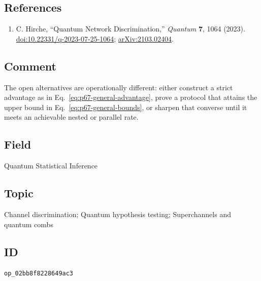 \subsection*{References}

\begin{enumerate}[label={},leftmargin=4.8em,labelsep=0.5em]
  \footnotesize
  \item[\textup{[Hir23]}]\label{ref:p67-hirche}
  C. Hirche, ``Quantum Network Discrimination,''
  \emph{Quantum} \textbf{7}, 1064 (2023).
  \href{https://doi.org/10.22331/q-2023-07-25-1064}{doi:10.22331/q-2023-07-25-1064};
  \href{https://arxiv.org/abs/2103.02404}{arXiv:2103.02404}.
\end{enumerate}

\subsection*{Comment}

The open alternatives are operationally different: either construct a strict
advantage as in Eq.~\eqref{eq:p67-general-advantage}, prove a protocol that
attains the upper bound in Eq.~\eqref{eq:p67-general-bounds}, or sharpen that
converse until it meets an achievable nested or parallel rate.

\subsection*{Field}

Quantum Statistical Inference

\subsection*{Topic}

Channel discrimination; Quantum hypothesis testing; Superchannels and quantum combs

\subsection*{ID}

\texttt{op\_02bb8f8228649ac3}
